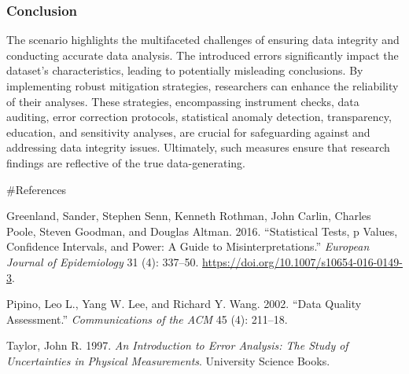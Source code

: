 \documentclass[
  letterpaper,
  DIV=11,
  numbers=noendperiod]{scrartcl}
\newlength{\cslhangindent}
\newenvironment{CSLReferences}[2] %
 {\begin{list}{}{%
  \setlength{\itemindent}{0pt}
  \setlength{\leftmargin}{0pt}
  \setlength{\parsep}{0pt}
  \ifodd #1
   \setlength{\leftmargin}{\cslhangindent}
   \setlength{\itemindent}{-1\cslhangindent}
  \fi
  \setlength{\itemsep}{#2\baselineskip}}}
 {\end{list}}
\begin{document}
\subsubsection{\texorpdfstring{\textbf{Conclusion}}{Conclusion}}\label{conclusion}

The scenario highlights the multifaceted challenges of ensuring data
integrity and conducting accurate data analysis. The introduced errors
significantly impact the dataset's characteristics, leading to
potentially misleading conclusions. By implementing robust mitigation
strategies, researchers can enhance the reliability of their analyses.
These strategies, encompassing instrument checks, data auditing, error
correction protocols, statistical anomaly detection, transparency,
education, and sensitivity analyses, are crucial for safeguarding
against and addressing data integrity issues. Ultimately, such measures
ensure that research findings are reflective of the true
data-generating.

\Newpage

\#References

\label{refs}
\begin{CSLReferences}{1}{0}
Greenland, Sander, Stephen Senn, Kenneth Rothman, John Carlin, Charles
Poole, Steven Goodman, and Douglas Altman. 2016. {``Statistical Tests, p
Values, Confidence Intervals, and Power: A Guide to
Misinterpretations.''} \emph{European Journal of Epidemiology} 31 (4):
337--50. \url{https://doi.org/10.1007/s10654-016-0149-3}.

Pipino, Leo L., Yang W. Lee, and Richard Y. Wang. 2002. {``Data Quality
Assessment.''} \emph{Communications of the ACM} 45 (4): 211--18.

Taylor, John R. 1997. \emph{An Introduction to Error Analysis: The Study
of Uncertainties in Physical Measurements}. University Science Books.

\end{CSLReferences}
\end{document}

